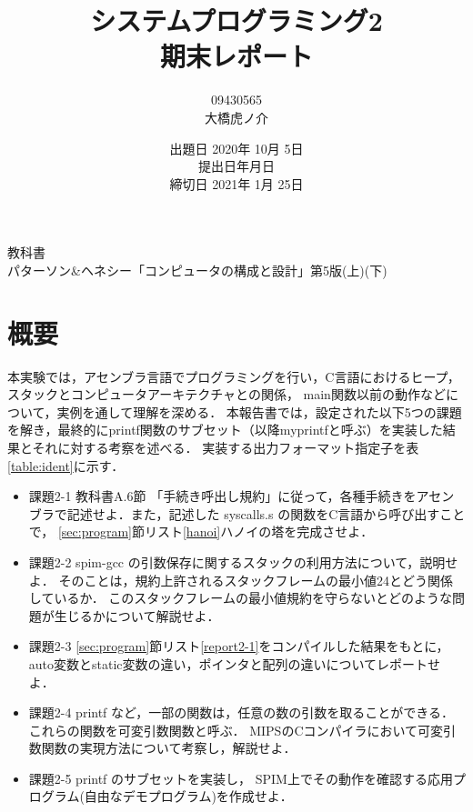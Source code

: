 \documentclass[11pt]{jarticle}
\begin{document}
\title{システムプログラミング2\\期末レポート}
\author{09430565\\大橋虎ノ介}
\date{出題日 2020年 10月 5日\\
提出日\number\year 年\number\month 月\number\day 日\\
締切日 2021年 1月 25日}

\maketitle
\begin{center}
教科書\\
 パターソン\&ヘネシー「コンピュータの構成と設計」第5版(上)(下)
\end{center}
\newpage

\section{概要} \label{sec:abstract}

本実験では，アセンブラ言語でプログラミングを行い，C言語におけるヒープ，
スタックとコンピュータアーキテクチャとの関係， main関数以前の動作などについて，実例を通して理解を深める．
本報告書では，設定された以下5つの課題を解き，最終的にprintf関数のサブセット（以降myprintfと呼ぶ）を実装した結果とそれに対する考察を述べる．
実装する出力フォーマット指定子を表\ref{table:ident}に示す．

\begin{itemize}
  \item 課題2-1 教科書A.6節 「手続き呼出し規約」に従って，各種手続きをアセンブラで記述せよ．また，記述した syscalls.s の関数をC言語から呼び出すことで， \ref{sec:program}節リスト\ref{hanoi}ハノイの塔を完成させよ．
  \item 課題2-2 spim-gcc の引数保存に関するスタックの利用方法について，説明せよ． そのことは，規約上許されるスタックフレームの最小値24とどう関係しているか． このスタックフレームの最小値規約を守らないとどのような問題が生じるかについて解説せよ．
  \item 課題2-3 \ref{sec:program}節リスト\ref{report2-1}をコンパイルした結果をもとに，auto変数とstatic変数の違い，ポインタと配列の違いについてレポートせよ．
  \item 課題2-4 printf など，一部の関数は，任意の数の引数を取ることができる． これらの関数を可変引数関数と呼ぶ． MIPSのCコンパイラにおいて可変引数関数の実現方法について考察し，解説せよ．
  \item 課題2-5 printf のサブセットを実装し， SPIM上でその動作を確認する応用プログラム(自由なデモプログラム)を作成せよ．
\end{itemize}
\end{document}
